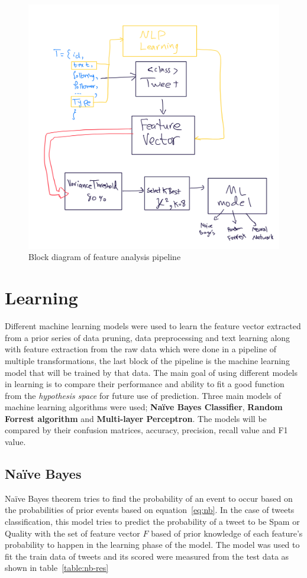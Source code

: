 \documentclass[conference]{IEEEtran}
\begin{document}
\begin{figure}
    \centering
    \includegraphics[scale=0.1]{feature-pipeline.png}
    \caption{Block diagram of feature analysis pipeline}
    \label{fig:feat-pipeline}
\end{figure}

\section{Learning}
Different machine learning models were used to learn the feature vector extracted from a prior series of data pruning, data preprocessing and text learning along with feature extraction from the raw data which were done in a pipeline of multiple transformations, the last block of the pipeline is the machine learning model that will be trained by that data. The main goal of using different models in learning is to compare their performance and ability to fit a good function from the \textit{hypothesis space} for future use of prediction. Three main models of machine learning algorithms were used; \textbf{Naïve  Bayes Classifier}, \textbf{Random Forrest algorithm} and \textbf{Multi-layer Perceptron}. The models will be compared by their confusion matrices, accuracy, precision, recall value and F1 value.  

\subsection{Naïve  Bayes}
Naïve  Bayes theorem tries to find the probability of an event to occur based on the probabilities of prior events based on equation~\ref{eq:nb}. In the case of tweets classification, this model tries to predict the probability of a tweet to be Spam or Quality with the set of feature vector $F$ based of prior knowledge of each feature's probability to happen in the learning phase of the model. The model was used to fit the train data of tweets and its scored were measured from the test data as shown in table~\ref{table:nb-res}
\end{document}

